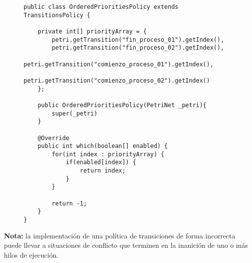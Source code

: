 \begin{figure}[H]
\centering
\begin{verbatim}
public class OrderedPrioritiesPolicy extends TransitionsPolicy {

    private int[] priorityArray = {
        petri.getTransition("fin_proceso_01").getIndex(),
        petri.getTransition("fin_proceso_02").getIndex(),
        petri.getTransition("comienzo_proceso_01").getIndex(),
        petri.getTransition("comienzo_proceso_02").getIndex()
    };

    public OrderedPrioritiesPolicy(PetriNet _petri){
        super(_petri)
    }
    
    @Override
    public int which(boolean[] enabled) {
        for(int index : priorityArray) {
            if(enabled[index]) {
                return index;
            }
        }
        
        return -1;
    }
}
\end{verbatim}
\end{figure}

\begin{framed}
\textbf{Nota:} la implementación de una política de transiciones de forma
incorrecta puede llevar a situaciones de conflicto que terminen en la inanición
de uno o más hilos de ejecución.
\end{framed}
